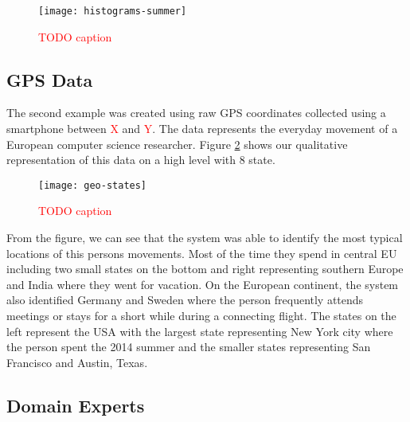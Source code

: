 \begin{figure}[h!]
	\centering
	\texttt{[image: histograms-summer]}
	\caption{\textcolor{red}{TODO caption}}
	\label{fig:histograms-summer}
\end{figure}

\subsection{GPS Data}

The second example was created using raw GPS coordinates collected using a smartphone between \textcolor{red}{X} and \textcolor{red}{Y}.
The data represents the everyday movement of a European computer science researcher. Figure \ref{fig:example-geo}
shows our qualitative representation of this data on a high level with 8 state.

\begin{figure}[h!]
	\centering
	\texttt{[image: geo-states]}
	\caption{\textcolor{red}{TODO caption}}
	\label{fig:example-geo}
\end{figure}

From the figure, we can see that the system was able to identify the most typical locations of this persons
movements. Most of the time they spend in central EU including two small states on the bottom and right
representing southern Europe and India where they went for vacation. On the European continent, the system
also identified Germany and Sweden where the person frequently attends meetings or stays for a short while
during a connecting flight. The states on the left represent the USA with the largest state representing New
York city where the person spent the 2014 summer and the smaller states representing San Francisco and Austin,
Texas.

\subsection{Domain Experts}